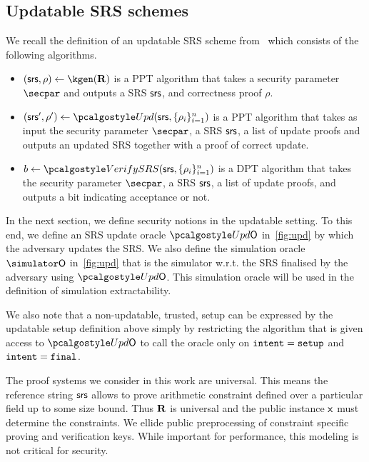 \subsection{Updatable SRS schemes}\label{def:upd-scheme}

We recall the definition of an updatable SRS scheme from~\cite{C:GKMMM18} which consists of the following algorithms.
\vspace{-8pt}
\begin{itemize} 
	\item
	$(\srs,\rho) \leftarrow \kgen(\REL)$ is a PPT algorithm that takes a security parameter $\secpar$ and outputs a SRS $\mathsf{srs}$, and correctness proof $\rho$.
	\item
	$ (\srs',\rho') \leftarrow \upd(\srs, \{\rho_i \}_{i=1}^n)$ is a PPT algorithm that takes as input the security parameter $\secpar$, a SRS $\mathsf{srs}$, a list of update proofs and outputs an updated SRS together with a proof of correct update. 
	\item
	$b \leftarrow \verifyCRS(\srs, \{\rho_i \}_{i=1}^n)$ is a DPT algorithm that takes the security parameter $\secpar$, a SRS $\mathsf{srs}$, a list of update proofs, and outputs a bit indicating acceptance or not.
\end{itemize}

In the next section, we define security notions in the updatable setting. To this end, we define an SRS update oracle $\initU$ in~\cref{fig:upd} by which the adversary updates the SRS. We also define the simulation oracle $\simO$ in~\cref{fig:upd} that is the simulator w.r.t. the SRS finalised by the adversary using $\initU$. This simulation oracle will be used in the definition of simulation extractability.

We also note that a non-updatable, trusted, setup can be expressed by the updatable setup definition above simply by restricting the algorithm that is given access to $\initU$ to call the oracle only on $\mathtt{intent} = \mathtt{setup}$ and $\mathtt{intent} = \mathtt{final}$.

 The proof systems we consider in this work are universal. This means the reference string $\mathsf{srs}$ allows to prove arithmetic constraint defined over a particular field up to some size bound. Thus $\mathbf{R}$ is universal and the public instance $\mathsf{x}$ must determine the constraints. We ellide public preprocessing of constraint specific proving and verification keys. While important for performance, this modeling is not critical for security.



